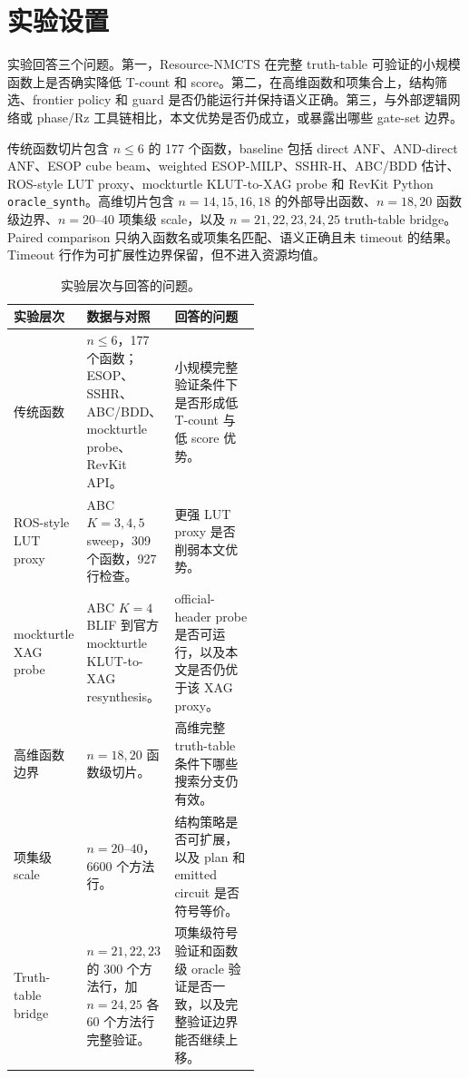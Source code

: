 \documentclass[UTF8,fontset=macnew,11pt]{ctexart}
\newcommand{\method}{Resource-NMCTS}
\newcommand{\anf}{\ensuremath{\mathrm{ANF}}}
\begin{document}
\section{实验设置}

实验回答三个问题。第一，\method{} 在完整 truth-table 可验证的小规模函数上是否确实降低 T-count 和 score。第二，在高维函数和项集合上，结构筛选、frontier policy 和 guard 是否仍能运行并保持语义正确。第三，与外部逻辑网络或 phase/Rz 工具链相比，本文优势是否仍成立，或暴露出哪些 gate-set 边界。

传统函数切片包含 $n\leq6$ 的 177 个函数，baseline 包括 direct \anf{}、AND-direct \anf{}、ESOP cube beam、weighted ESOP-MILP、SSHR-H、ABC/BDD 估计、ROS-style LUT proxy、mockturtle KLUT-to-XAG probe 和 RevKit Python \texttt{oracle\_synth}。高维切片包含 $n=14,15,16,18$ 的外部导出函数、$n=18,20$ 函数级边界、$n=20$--$40$ 项集级 scale，以及 $n=21,22,23,24,25$ truth-table bridge。Paired comparison 只纳入函数名或项集名匹配、语义正确且未 timeout 的结果。Timeout 行作为可扩展性边界保留，但不进入资源均值。

\begin{table}[H]
\centering
\scriptsize
\caption{实验层次与回答的问题。}
\label{tab:experiment-layers}
\begin{tabularx}{\linewidth}{>{\raggedright\arraybackslash}p{0.23\linewidth}>{\raggedright\arraybackslash}p{0.31\linewidth}>{\raggedright\arraybackslash}X}
\toprule
实验层次 & 数据与对照 & 回答的问题 \\
\midrule
传统函数 & $n\leq6$，177 个函数；ESOP、SSHR、ABC/BDD、mockturtle probe、RevKit API。 & 小规模完整验证条件下是否形成低 T-count 与低 score 优势。 \\
ROS-style LUT proxy & ABC $K=3,4,5$ sweep，309 个函数，927 行检查。 & 更强 LUT proxy 是否削弱本文优势。 \\
mockturtle XAG probe & ABC $K=4$ BLIF 到官方 mockturtle KLUT-to-XAG resynthesis。 & official-header probe 是否可运行，以及本文是否仍优于该 XAG proxy。 \\
高维函数边界 & $n=18,20$ 函数级切片。 & 高维完整 truth-table 条件下哪些搜索分支仍有效。 \\
项集级 scale & $n=20$--$40$，6600 个方法行。 & 结构策略是否可扩展，以及 plan 和 emitted circuit 是否符号等价。 \\
Truth-table bridge & $n=21,22,23$ 的 300 个方法行，加 $n=24,25$ 各 60 个方法行完整验证。 & 项集级符号验证和函数级 oracle 验证是否一致，以及完整验证边界能否继续上移。 \\
\bottomrule
\end{tabularx}
\end{table}
\end{document}
